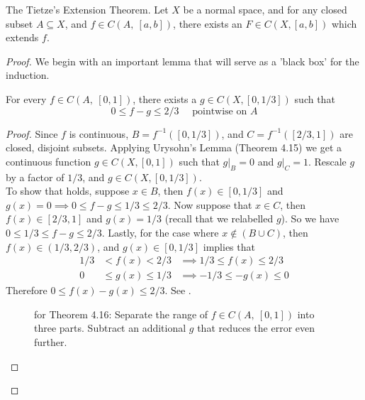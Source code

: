 \documentclass[../../main.tex]{subfiles}
\begin{document}
\begin{wts}
The Tietze's Extension Theorem. Let $X$ be a normal space, and for any closed subset $A\subseteq X$, and $f\in C(A,\:[a,b])$, there exists an $F\in C(X,[a,b])$ which extends $f$.
\end{wts}
\begin{proof}
We begin with an important lemma that will serve as a 'black box' for the induction.
\begin{lemma}\label{lemma:theorem-4.16}
For every $f\in C(A,\:[0,1])$, there exists a $g\in C(X, [0, 1/3])$ such that 
\begin{equation}\label{eq:1}
0\leq f-g\leq 2/3 \quad\textrm{ pointwise on } A    
\end{equation}
\end{lemma}
\begin{proof}
Since $f$ is continuous, $B=f^{-1}([0,1/3])$, and $C=f^{-1}([2/3,1])$ are closed, disjoint subsets. Applying Urysohn's Lemma (Theorem 4.15) we get a continuous function $g\in C(X,[0,1])$ such that $g|_B = 0$ and $g|_C = 1$. Rescale $g$ by a factor of $1/3$, and $g\in C(X,[0,1/3])$.\\

To show that  holds, suppose $x\in B$, then $f(x)\in[0,1/3]$ and $g(x)=0\implies 0\leq f-g\leq 1/3\leq 2/3$. Now suppose that $x\in C$, then $f(x)\in[2/3,1]$ and $g(x)=1/3$ (recall that we relabelled $g$). So we have $0\leq 1/3\leq f-g\leq 2/3$. Lastly, for the case where $x\notin (B\cup C)$, then $f(x)\in (1/3, 2/3)$, and $g(x)\in[0, 1/3]$ implies that 
\begin{align*}
    1/3 &<    f(x) <    2/3 &\implies 1/3 \leq   f(x) \leq 2/3\\
    0   &\leq g(x) \leq 1/3 &\implies -1/3 \leq -g(x) \leq 0    
\end{align*}
Therefore $0\leq f(x)-g(x)\leq 2/3$. See .\\
\begin{figure}
    \centering
    \caption{ for Theorem 4.16: Separate the range of $f\in C(A,\:[0,1])$ into three parts. Subtract an additional $g$ that reduces the error even further.}
    \label{fig:theorem-4.16-error}
\end{figure}
\end{proof}


\end{proof}
\end{document}
